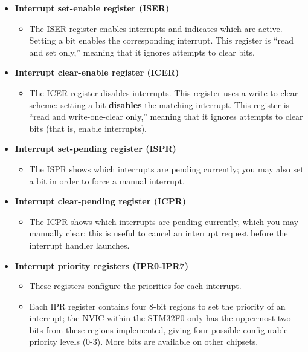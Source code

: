 \documentclass[openany,11pt,fleqn]{book} %
\begin{document}
\begin{itemize}
    \item \textbf{Interrupt set-enable register (ISER)}
        \begin{itemize}
            \item The ISER register enables interrupts and indicates which are active.
            Setting a bit enables the corresponding interrupt. This register is ``read and set only,'' meaning that it ignores attempts to clear bits. 
        \end{itemize}
    \item \textbf{Interrupt clear-enable register (ICER)}
        \begin{itemize}
            \item The ICER register disables interrupts.
            This register uses a write to clear scheme: setting a bit \textbf{disables} the matching interrupt. This register is ``read and write-one-clear only,'' meaning that it ignores attempts to clear bits (that is, enable interrupts). 
        \end{itemize}
    \item \textbf{Interrupt set-pending register (ISPR)}
        \begin{itemize}
            \item The ISPR shows which interrupts are pending currently; you may also set a bit in order to force a manual interrupt. 
        \end{itemize}
    \item \textbf{Interrupt clear-pending register (ICPR)}
        \begin{itemize}
            \item The ICPR shows which interrupts are pending currently, which you may manually clear; this is useful to cancel an interrupt request before the interrupt handler launches.
        \end{itemize}
    \item \textbf{Interrupt priority registers (IPR0-IPR7)}
        \begin{itemize}
            \item These registers configure the priorities for each interrupt. 
            \item Each IPR register contains four 8-bit regions to set the priority of an interrupt; the NVIC within the STM32F0 only has the uppermost two bits from these regions implemented, giving four possible configurable priority levels (0-3). More bits are available on other chipsets.           
        \end{itemize}
\end{itemize}
\end{document}
